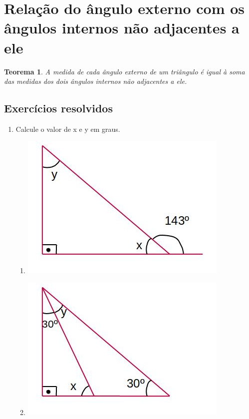 \documentclass{article}
\newtheorem{theorem}{Teorema}[section]
\begin{document}
\section{Relação do ângulo externo com os ângulos internos não adjacentes a ele}
\begin{theorem}
A medida de cada ângulo externo  de um triângulo é igual à soma das medidas dos dois ângulos internos não adjacentes a ele. 
\end{theorem}
\subsection{Exercícios resolvidos}
\begin{enumerate}
    \item Calcule o valor de x e y em graus. 
\begin{multicols}{2}

\begin{enumerate}
\item \includegraphics[scale = 0.6]{triangulos1.jpg}
\item \includegraphics[scale = 0.6]{triangulos2.jpg}
\end{enumerate}
\end{multicols}    
\end{enumerate}
\end{document}
